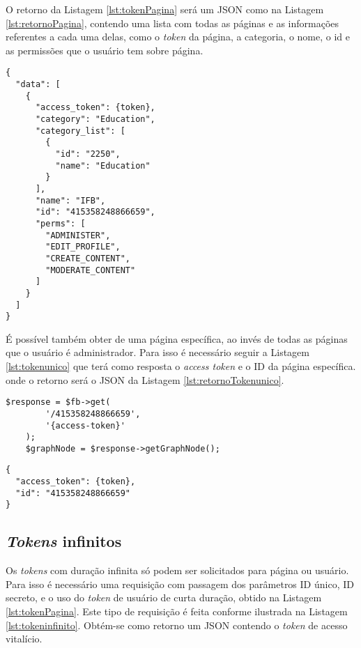 O retorno da Listagem \ref{lst:tokenPagina} será um JSON como na Listagem \ref{lst:retornoPagina}, contendo uma lista com todas as páginas e as informações referentes a cada uma delas, como o \textit{token} da página, a categoria, o nome, o id e as permissões que o usuário tem sobre página. 

\begin{lstlisting}[caption={Retorno ao solicitar o \textit{token} de acesso de página},label={lst:retornoPagina},float]
{
  "data": [
    {
      "access_token": {token},
      "category": "Education",
      "category_list": [
        {
          "id": "2250",
          "name": "Education"
        }
      ],
      "name": "IFB",
      "id": "415358248866659",
      "perms": [
        "ADMINISTER",
        "EDIT_PROFILE",
        "CREATE_CONTENT",
        "MODERATE_CONTENT"
      ]
    }
  ]
}
\end{lstlisting}

É possível também obter de uma página específica, ao invés de todas as páginas que o usuário é administrador. Para isso é necessário seguir a Listagem \ref{lst:tokenunico} que terá como resposta o \textit{access token} e o ID da página específica. onde o retorno será o JSON da Listagem \ref{lst:retornoTokenunico}.

\begin{lstlisting}[caption={Obtendo Token de uma única página}, label={lst:tokenunico},float]
    $response = $fb->get(
        '/415358248866659',
        '{access-token}'
    );
    $graphNode = $response->getGraphNode();
\end{lstlisting}

\begin{lstlisting}[caption={Retorno \textit{token} de uma única página específica},label={lst:retornoTokenunico},float]
{
  "access_token": {token},
  "id": "415358248866659"
}
\end{lstlisting}


\subsection{\textit{Tokens} infinitos}
Os \textit{tokens} com duração infinita só podem ser solicitados para página ou usuário. Para isso é necessário uma requisição com passagem dos parâmetros ID único, ID secreto, e o uso do \textit{token} de usuário de curta duração, obtido na Listagem \ref{lst:tokenPagina}. Este tipo de requisição é feita conforme ilustrada na Listagem \ref{lst:tokeninfinito}. Obtém-se como retorno um JSON contendo o \textit{token} de acesso vitalício.

